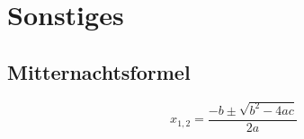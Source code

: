 \section{Sonstiges}

\subsection{Mitternachtsformel}

\begin{displaymath}
	x_{1,2} = \frac{-b \pm \sqrt{b^2 - 4ac}}{2a}
\end{displaymath}